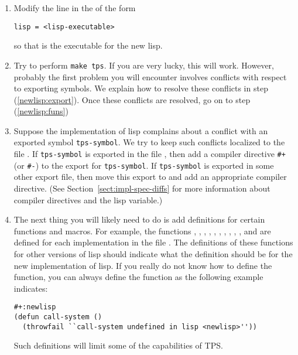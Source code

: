 \begin{enumerate}
\item Modify the line in the  of the form
\begin{verbatim}
lisp = <lisp-executable>
\end{verbatim}
so that {\tt <lisp-executable>} is the executable for the new lisp.
\item
  Try to perform {\tt make tps}.  If you are very lucky, this will work.
  However, probably the first problem you will encounter involves conflicts
  with respect to exporting symbols.  
  We explain how to resolve these conflicts in step (\ref{newlisp:export}).
  Once these conflicts are resolved, go on to step (\ref{newlisp:funs})
\item\label{newlisp:export}
  Suppose the implementation of lisp complains about a conflict with an exported symbol {\tt tps-symbol}.
  We try to keep such conflicts localized to the file
  {}.
  If {\tt tps-symbol} is exported in the file {},
  then add a compiler directive {\tt \#+} (or {\tt \#-}) 
  to the export for {\tt tps-symbol}.
  If {\tt tps-symbol} is exported in some other export file,
  then move this export to {}
  and add an appropriate compiler directive.
  (See Section~\ref{sect:impl-spec-diffs} for more information about compiler directives
  and the  lisp variable.)
\item\label{newlisp:funs}
  The next thing you will likely need to do is add definitions for certain functions and macros.
  For example, the functions , 
  , 
  , ,
  , , ,
  , ,
  ,
   and
  are defined for each implementation in the file . 
  The definitions of these functions for other versions of lisp should
  indicate what the definition should be for the new implementation of lisp.
  If you really do not know how to define the function,
  you can always define the function as the following example indicates:
\begin{verbatim}
#+:newlisp
(defun call-system ()
  (throwfail ``call-system undefined in lisp <newlisp>''))
\end{verbatim}
  Such definitions will limit some of the capabilities of TPS.


\end{enumerate}

